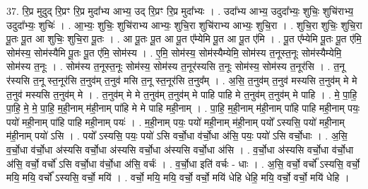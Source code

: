 \documentclass[17pt]{extarticle}
\begin{document}
37. रि॒प्र मुदुद् रि॒प्रꣳ रि॒प्र मुदा᳚भ्य आभ्य॒ उद् रि॒प्रꣳ रि॒प्र मुदा᳚भ्यः । . उदा᳚भ्य आभ्य॒ उदुदा᳚भ्यः॒ शुचिः॒ शुचि॑राभ्य॒ उदुदा᳚भ्यः॒ शुचिः॑ । . आ॒भ्यः॒ शुचिः॒ शुचि॑राभ्य आभ्यः॒ शुचि॒रा शुचि॑राभ्य आभ्यः॒ शुचि॒रा । . शुचि॒रा शुचिः॒ शुचि॒रा पू॒तः पू॒त आ शुचिः॒ शुचि॒रा पू॒तः । . आ पू॒तः पू॒त आ पू॒त ए᳚म्येमि पू॒त आ पू॒त ए॑मि । . पू॒त ए᳚म्येमि पू॒तः पू॒त ए॑मि॒ सोम॑स्य॒ सोम॑स्यैमि पू॒तः पू॒त ए॑मि॒ सोम॑स्य । . ए॒मि॒ सोम॑स्य॒ सोम॑स्यैम्येमि॒ सोम॑स्य त॒नूस्त॒नूः सोम॑स्यैम्येमि॒ सोम॑स्य त॒नूः । . सोम॑स्य त॒नूस्त॒नूः सोम॑स्य॒ सोम॑स्य त॒नूर॑स्यसि त॒नूः सोम॑स्य॒ सोम॑स्य त॒नूर॑सि । . त॒नू र॑स्यसि त॒नू स्त॒नूर॑सि त॒नुव॑म् त॒नुव॑ मसि त॒नू स्त॒नूर॑सि त॒नुव᳚म् । . अ॒सि॒ त॒नुव॑म् त॒नुव॑ मस्यसि त॒नुव॑म् मे मे त॒नुव॑ मस्यसि त॒नुव॑म् मे । . त॒नुव॑म् मे मे त॒नुव॑म् त॒नुव॑म् मे पाहि पाहि मे त॒नुव॑म् त॒नुव॑म् मे पाहि । . मे॒ पा॒हि॒ पा॒हि॒ मे॒ मे॒ पा॒हि॒ म॒ही॒नाम् म॑ही॒नाम् पा॑हि मे मे पाहि मही॒नाम् । . पा॒हि॒ म॒ही॒नाम् म॑ही॒नाम् पा॑हि पाहि मही॒नाम् पयः॒ पयो॑ मही॒नाम् पा॑हि पाहि मही॒नाम् पयः॑ । . म॒ही॒नाम् पयः॒ पयो॑ मही॒नाम् म॑ही॒नाम् पयो᳚ ऽस्यसि॒ पयो॑ मही॒नाम् म॑ही॒नाम् पयो॑ ऽसि । . पयो᳚ ऽस्यसि॒ पयः॒ पयो॑ ऽसि वर्चो॒धा व॑र्चो॒धा अ॑सि॒ पयः॒ पयो॑ ऽसि वर्चो॒धाः । . अ॒सि॒ व॒र्चो॒धा व॑र्चो॒धा अ॑स्यसि वर्चो॒धा अ॑स्यसि वर्चो॒धा अ॑स्यसि वर्चो॒धा अ॑सि । . व॒र्चो॒धा अ॑स्यसि वर्चो॒धा व॑र्चो॒धा अ॑सि॒ वर्चो॒ वर्चो॑ ऽसि वर्चो॒धा व॑र्चो॒धा अ॑सि॒ वर्चः॑ । . व॒र्चो॒धा इति॑ वर्चः - धाः । . अ॒सि॒ वर्चो॒ वर्चो᳚ ऽस्यसि॒ वर्चो॒ मयि॒ मयि॒ वर्चो᳚ ऽस्यसि॒ वर्चो॒ मयि॑ । . वर्चो॒ मयि॒ मयि॒ वर्चो॒ वर्चो॒ मयि॑ धेहि धेहि॒ मयि॒ वर्चो॒ वर्चो॒ मयि॑ धेहि । \newline
\pagebreak
{}
\end{document}
